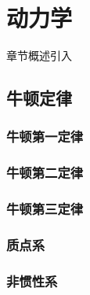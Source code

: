 \chapter{动力学}\label{3}

章节概述引入

\section{牛顿定律}\label{3-1}

\subsection{牛顿第一定律}\label{3-1-1}

\subsection{牛顿第二定律}\label{3-1-2}

\subsection{牛顿第三定律}\label{3-1-3}

\subsection{质点系}\label{3-1-4}

\subsection{非惯性系}\label{3-1-5}